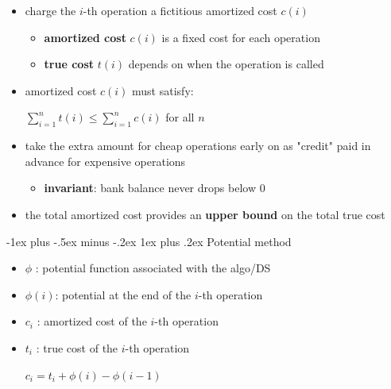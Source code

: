 \documentclass[10pt, landscape]{article}
\makeatletter
\renewcommand{\subsubsection}{\@startsection{subsubsection}{3}{0mm}%
  {-1ex plus -.5ex minus -.2ex}%
  {1ex plus .2ex}%
{\normalfont\small\bfseries}}%
\makeatother
\begin{document}
\begin{multicols*}{4}
  \begin{itemize}
    \item charge the $i$-th operation a fictitious amortized cost $c(i)$ 
      \begin{itemize}
        \item \textbf{amortized cost} $c(i)$ is a fixed cost for each operation
        \item \textbf{true cost} $t(i)$ depends on when the operation is called
      \end{itemize}
    \item amortized cost $c(i)$ must satisfy:
      \begin{tightcenter}
        $\sum^n_{i=1} t(i) \leq \sum^n_{i=1} c(i) $ for all $n$
      \end{tightcenter}
    \item take the extra amount for cheap operations early on as "credit" paid in advance for expensive operations
      \begin{itemize}
        \item \textbf{invariant}: bank balance never drops below 0
      \end{itemize}
    \item the total amortized cost provides an \textbf{upper bound} on the total true cost
  \end{itemize}

  \subsubsection{Potential method}

  \begin{itemize}
    \item $\phi$ : potential function associated with the algo/DS
    \item $\phi(i)$: potential at the end of the $i $-th operation
    \item $c_i$ : amortized cost of the $i$-th operation
    \item $t_i$ : true cost of the $i$-th operation
      \begin{tightcenter}
        $c_i = t_i + \phi(i) - \phi(i-1)$ 


\end{tightcenter}
\end{itemize}
\end{multicols*}
\end{document}
